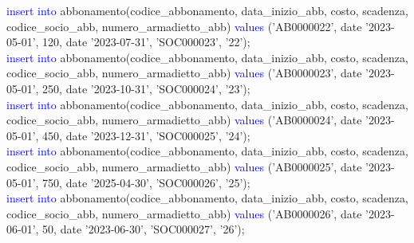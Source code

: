 \documentclass{article}
\begin{document}
\begin{flushleft}
{        \hspace*{0.5em}\textcolor{blue}{insert into} abbonamento(codice\_abbonamento, data\_inizio\_abb, costo, scadenza, \hspace*{0.5em}codice\_socio\_abb, numero\_armadietto\_abb) \textcolor{blue}{values} ('AB0000022', date '2023-05-01', \hspace*{0.5em}120, date '2023-07-31', 'SOC000023', '22'); \\
        \vspace{2mm}
        \hspace*{0.5em}\textcolor{blue}{insert into} abbonamento(codice\_abbonamento, data\_inizio\_abb, costo, scadenza, \hspace*{0.5em}codice\_socio\_abb, numero\_armadietto\_abb) \textcolor{blue}{values} ('AB0000023', date '2023-05-01', \hspace*{0.5em}250, date '2023-10-31', 'SOC000024', '23'); \\
        \vspace{2mm}
        \hspace*{0.5em}\textcolor{blue}{insert into} abbonamento(codice\_abbonamento, data\_inizio\_abb, costo, scadenza, \hspace*{0.5em}codice\_socio\_abb, numero\_armadietto\_abb) \textcolor{blue}{values} ('AB0000024', date '2023-05-01', \hspace*{0.5em}450, date '2023-12-31', 'SOC000025', '24'); \\
        \vspace{2mm}
        \hspace*{0.5em}\textcolor{blue}{insert into} abbonamento(codice\_abbonamento, data\_inizio\_abb, costo, scadenza, \hspace*{0.5em}codice\_socio\_abb, numero\_armadietto\_abb) \textcolor{blue}{values} ('AB0000025', date '2023-05-01', \hspace*{0.5em}750, date '2025-04-30', 'SOC000026', '25'); \\
        \vspace{2mm}
        \hspace*{0.5em}\textcolor{blue}{insert into} abbonamento(codice\_abbonamento, data\_inizio\_abb, costo, scadenza, \hspace*{0.5em}codice\_socio\_abb, numero\_armadietto\_abb) \textcolor{blue}{values} ('AB0000026', date '2023-06-01', \hspace*{0.5em}50, date '2023-06-30', 'SOC000027', '26'); \\
        \vspace{2mm}
}
\end{flushleft}
\end{document}
